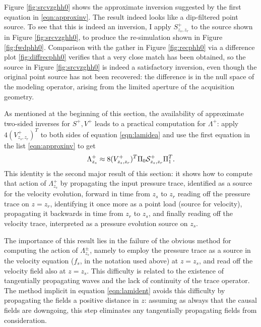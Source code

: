 Figure \ref{fig:srcvzghh0} shows the approximate inversion suggested
by the first equation in \ref{eqn:approxinv}. The result indeed looks
like a dip-filtered point source. To see that this is indeed an
inversion, I apply $S^{+}_{z_s,z_r}$ to the source shown in Figure
\ref{fig:srcvzghh0}, to produce the re-simulation shown in Figure
\ref{fig:fwdphh0}. Comparison with the gather in Figure
\ref{fig:recphh0} via a difference plot \ref{fig:diffrecphh0} verifies
that a very close match has been obtained, so the source in Figure
\ref{fig:srcvzghh0} is indeed a satisfactory inversion, even though
the original point source has not been recovered: the difference is in
the null space of the modeling operator, arising from the limited
aperture of the acquisition geometry.


As mentioned at the beginning of this section, the availability of approximate two-sided inverses for $S^{+},
V^{+}$ leads to a practical computation for $\Lambda^{+}$: apply
$4(V^{+}_{z_s,z_r})^T$ to both sides of equation \ref{eqn:lamidea} and
use the first equation in the list \ref{eqn:approxinv} to get
\begin{equation}
  \label{eqn:lamident}
  \Lambda^+_{z_s} \approx 8(V^{+}_{z_s,z_r})^T\Pi_0 {\cal S}^+_{z_s,z_r}\Pi_1^T.
\end{equation}
This identity is the second major result of this section: it shows how
to compute that action of $\Lambda^+_{z_s}$ by propagating the input
pressure trace, identified as a source for the velocity evolution,
forward in time from $z_s$ to $z_r$
reading off the pressure trace on $z=z_r$, identifying it once more as
a point load (source for velocity), propagating it backwards in time from $z_r$ to
$z_s$, and finally reading off the velocity trace, interpreted as a
pressure evolution source on $z_s$. 

The importance of this result lies in the failure of the obvious
method for computing the action of $\Lambda^{\pm}_{z_s}$, namely to
employ the pressure trace as a source in the velocity equation ($f_s$,
in the notation used above) at $z=z_s$, and read off the velocity
field also at $z=z_s$. This difficulty is related to the existence of
tangentially propagating waves and the lack of continuity of the trace
operator. The method implicit in equation \ref{eqn:lamident} avoids
this difficulty by propagating the fields a positive distance in $z$:
assuming as always that the causal fields are downgoing, this step
eliminates any tangentially propagating fields from consideration.

